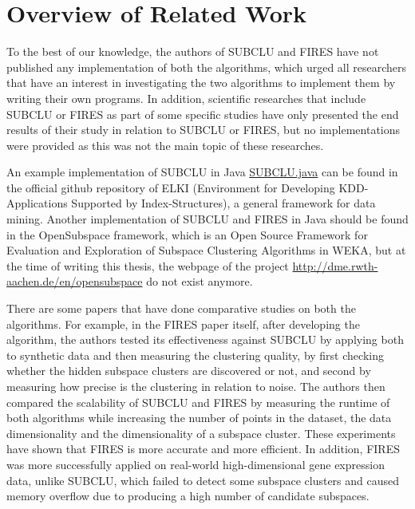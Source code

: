 \section{Overview of Related Work}\raggedbottom

To the best of our knowledge, the authors of SUBCLU and FIRES have not published any implementation of both the algorithms, which urged all researchers that have an interest in investigating the two algorithms to implement them by writing their own programs.
In addition, scientific researches that include SUBCLU or FIRES as part of some specific studies have only presented the end results of their study in relation to SUBCLU or FIRES, but no implementations were provided as this was not the main topic of these researches.

An example implementation of SUBCLU in Java \href{https://github.com/elki-project/elki/blob/master/elki-clustering/src/main/java/elki/clustering/subspace/SUBCLU.java}{SUBCLU.java} can be found in the official github repository of ELKI (Environment for Developing KDD-Applications Supported by Index-Structures), a general framework for data mining. Another implementation of SUBCLU and FIRES in Java should be found in the OpenSubspace framework, which is an Open Source Framework for Evaluation and Exploration of Subspace Clustering Algorithms in WEKA, but at the time of writing this thesis, the webpage of the project \href{http://dme.rwth-aachen.de/en/opensubspace}{http://dme.rwth-aachen.de/en/opensubspace} do not exist anymore.

There are some papers that have done comparative studies on both the algorithms. For example, in the FIRES \citep{fires} paper itself, after developing the algorithm, the authors tested its effectiveness against SUBCLU \citep{subclu} by applying both to synthetic data and then measuring the clustering quality, by first checking whether the hidden subspace clusters are discovered or not, and second by measuring how precise is the clustering in relation to noise. 
The authors then compared the scalability of SUBCLU and FIRES by measuring the runtime of both algorithms while increasing the number of points in the dataset, the data dimensionality and the dimensionality of a subspace cluster. These experiments have shown that FIRES is more accurate and more efficient. In addition, FIRES was more successfully applied on real-world high-dimensional gene expression data, unlike SUBCLU, which failed to detect some subspace clusters and caused memory overflow due to producing a high number of candidate subspaces.

